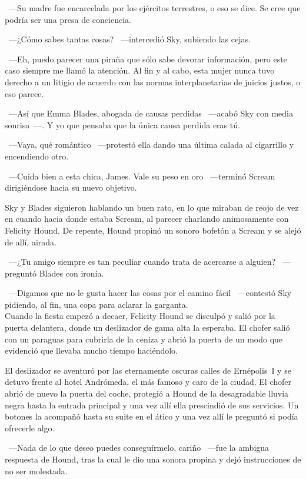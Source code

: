 ~---Su madre fue encarcelada por los ejércitos terrestres, o eso se dice. Se cree que podría ser una presa de conciencia.

~---¿Cómo sabes tantas cosas? ~---intercedió Sky, subiendo las cejas.

~---Eh, puedo parecer una piraña que sólo sabe devorar información, pero este caso siempre me llamó la atención. Al fin y al cabo, esta mujer nunca tuvo derecho a un litigio de acuerdo con las normas interplanetarias de juicios justos, o eso parece.

~---Así que Emma Blades, abogada de causas perdidas ~---acabó Sky con media sonrisa~---. Y yo que pensaba que la única causa perdida eras tú.

~---Vaya, qué romántico ~---protestó ella dando una última calada al cigarrillo y encendiendo otro.

~---Cuida bien a esta chica, James. Vale su peso en oro ~---terminó Scream dirigiéndose hacia su nuevo objetivo.

Sky y Blades siguieron hablando un buen rato, en lo que miraban de reojo de vez en cuando hacia donde estaba Scream, al parecer charlando animosamente con Felicity Hound. De repente, Hound propinó un sonoro bofetón a Scream y se alejó de allí, airada.

~---¿Tu amigo siempre es tan peculiar cuando trata de acercarse a alguien? ~---preguntó Blades con ironía.

~---Digamos que no le gusta hacer las cosas por el camino fácil ~---contestó Sky pidiendo, al fin, una copa para aclarar la garganta.\\

\noindent{}Cuando la fiesta empezó a decaer, Felicity Hound se disculpó y salió por la puerta delantera, donde un deslizador de gama alta la esperaba. El chofer salió con un paraguas para cubrirla de la ceniza y abrió la puerta de un modo que evidenció que llevaba mucho tiempo haciéndolo.

El deslizador se aventuró por las eternamente oscuras calles de Ernépolis~I y se detuvo frente al hotel Andrómeda, el más famoso y caro de la ciudad. El chofer abrió de nuevo la puerta del coche, protegió a Hound de la desagradable lluvia negra hasta la entrada principal y una vez allí ella prescindió de sus servicios.
Un botones la acompañó hasta su suite en el ático y una vez allí le preguntó si podía ofrecerle algo.

~---Nada de lo que deseo puedes conseguírmelo, cariño ~---fue la ambigua respuesta de Hound, tras la cual le dio una sonora propina y dejó instrucciones de no ser molestada.

